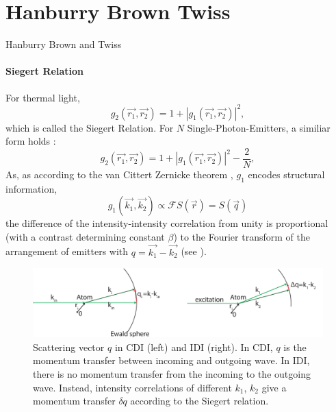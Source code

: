 \section{Hanburry Brown Twiss}
Hanburry Brown and Twiss 


\paragraph{Siegert Relation}
For thermal light, 
\begin{equation}
	g_2(\vec{r_1},\vec{r_2}) = 1+ |g_1(\vec{r_1},\vec{r_2}) |^2 ,
\end{equation}
which is called the Siegert Relation.
For $N$ Single-Photon-Emitters, a similiar form holds \cite{classen2017}:
\begin{equation}
	g_2(\vec{r_1},\vec{r_2}) = 1+ |g_1(\vec{r_1},\vec{r_2}) |^2 - \frac{2}{N} ,
\end{equation}
As, as according to the van Cittert Zernicke theorem , $g_1$ encodes structural information, 
\begin{equation}
g_1(\vec{k_1},\vec{k_2}) \propto \mathscr{F}S(\vec{r}) = S(\vec{q})
\end{equation}
the difference of the intensity-intensity correlation from unity is proportional (with a contrast determining constant $\beta$) to the Fourier transform of the arrangement of emitters with $q=\vec{k_1}-\vec{k_2}$ (see ).
 \begin{figure}
	\centering
	\includegraphics[width=0.9\linewidth]{images/scatteringvectors.pdf}
	\caption[Scattering Vectors]{Scattering vector $q$ in CDI (left) and IDI (right). In CDI, $q$ is the momentum transfer between incoming and outgoing wave. In IDI, there is no momentum transfer from the incoming to the outgoing wave. Instead, intensity correlations of different $k_1$, $k_2$ give a momentum transfer $\delta q$ according to the Siegert relation.}
	\label{fig:scatteringvectors}
	
\end{figure}

